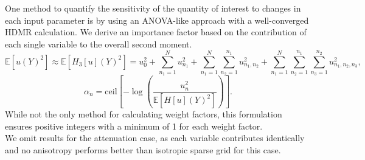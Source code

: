 \documentclass{mc2015}
\newcommand{\expv}[1]{\ensuremath{\mathbb{E}[ #1]}}
\begin{document}
One method to quantify the sensitivity of the quantity of interest to changes in each input parameter is by using an ANOVA-like approach with a well-converged HDMR calculation.  We derive an importance factor based on the contribution of each single variable to the overall second moment.
\begin{equation}
\expv{u(Y)^2} \approx \expv{H_3[u](Y)^2} =
                    u_0^2 + \sum_{n_1=1}^N u_{n_1}^2 + \sum_{n_1=1}^N\sum_{n_2=1}^{n_1} u_{n_1,n_2}^2 + 
                     \sum_{n_1=1}^N\sum_{n_2=1}^{n_1}\sum_{n_3=1}^{n_2}u_{n_1,n_2,n_3}^2,
\end{equation}
\begin{equation}
\alpha_n = \text{ceil}\left[-\log\left(\frac{u_n^2}{\expv{H[u](Y)^2}}\right)\right].
\end{equation}
While not the only method for calculating weight factors, this formulation ensures positive integers with a minimum of 1 for each weight factor.\\

We omit results for the attenuation case, as each variable contributes identically and no anisotropy performs better than isotropic sparse grid for this case.
\end{document}
